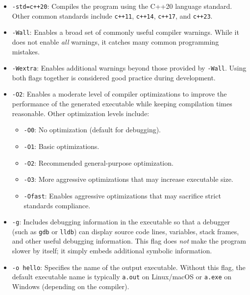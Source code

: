 \documentclass[10pt]{article}
\begin{document}
\begin{itemize}
    \item \texttt{-std=c++20}: Compiles the program using the C++20 language standard. Other common standards include \texttt{c++11}, \texttt{c++14}, \texttt{c++17}, and \texttt{c++23}.

    \item \texttt{-Wall}: Enables a broad set of commonly useful compiler warnings. While it does not enable \emph{all} warnings, it catches many common programming mistakes.

    \item \texttt{-Wextra}: Enables additional warnings beyond those provided by \texttt{-Wall}. Using both flags together is considered good practice during development.

    \item \texttt{-O2}: Enables a moderate level of compiler optimizations to improve the performance of the generated executable while keeping compilation times reasonable. Other optimization levels include:
    \begin{itemize}
        \item \texttt{-O0}: No optimization (default for debugging).
        \item \texttt{-O1}: Basic optimizations.
        \item \texttt{-O2}: Recommended general-purpose optimization.
        \item \texttt{-O3}: More aggressive optimizations that may increase executable size.
        \item \texttt{-Ofast}: Enables aggressive optimizations that may sacrifice strict standards compliance.
    \end{itemize}

    \item \texttt{-g}: Includes debugging information in the executable so that a debugger (such as \texttt{gdb} or \texttt{lldb}) can display source code lines, variables, stack frames, and other useful debugging information. This flag does \emph{not} make the program slower by itself; it simply embeds additional symbolic information.

    \item \texttt{-o hello}: Specifies the name of the output executable. Without this flag, the default executable name is typically \texttt{a.out} on Linux/macOS or \texttt{a.exe} on Windows (depending on the compiler).
\end{itemize}
\end{document}

